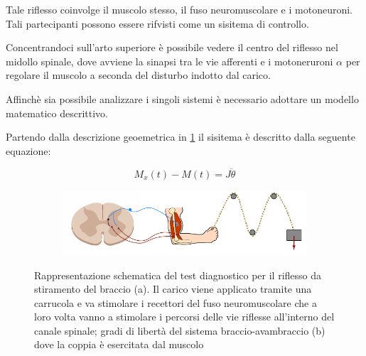 Tale riflesso coinvolge il muscolo stesso, il fuso neuromuscolare e i motoneuroni. Tali partecipanti possono essere rifvisti come un sisitema di controllo. 

Concentrandoci sull'arto superiore è possibile vedere il centro del riflesso nel midollo spinale, dove avviene la sinapsi tra le vie afferenti e i motoneruroni $\alpha$ per regolare il muscolo a seconda del disturbo indotto dal carico.






Affinchè sia possibile analizzare i singoli sistemi è necessario adottare un modello matematico descrittivo.

Partendo dalla descrizione geoemetrica in \cref{fig:avambraccio} il sisitema è descritto dalla seguente equazione:

\begin{equation}
	M_{x}(t)-M(t)=J \ddot{\theta}
\end{equation}



\begin{figure}[t!]
	\centering
	\begin{subfigure}{0.7\linewidth}
		\centering
		\includegraphics[width=0.95\linewidth]{figures/avambraccio_schema}\caption{}
	\end{subfigure}\hfill
	\begin{subfigure}{0.3\linewidth}
		\centering
		\footnotesize{\def\svgwidth{0.9\linewidth}
			}
		\caption{}
	\end{subfigure}
	\caption{Rappresentazione schematica del test diagnostico per il riflesso da stiramento del braccio (a). Il carico viene applicato tramite una carrucola e va stimolare i recettori del fuso neuromuscolare che a loro volta vanno a stimolare i percorsi delle vie riflesse all'interno del canale spinale; gradi di libertà del sistema braccio-avambraccio (b) dove la coppia è esercitata dal muscolo}
	\label{fig:avambraccio}
\end{figure}






